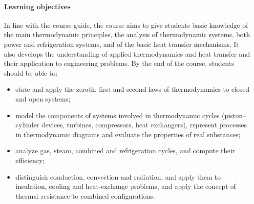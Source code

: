\documentclass[11pt]{article}
\begin{document}
\paragraph{Learning objectives}

In line with the course guide, the course aims to give students basic knowledge of the main thermodynamic principles, the analysis of thermodynamic systems, both power and refrigeration systems, and of the basic heat transfer mechanisms. 
It also develops the understanding of applied thermodynamics and heat transfer and their application to engineering problems.
By the end of the course, students should be able to:
\begin{itemize}
  \item state and apply the zeroth, first and second laws of thermodynamics to closed and   open systems;
  \item model the components of systems involved in thermodynamic cycles (piston--cylinder devices, turbines, compressors, heat exchangers), represent processes in thermodynamic diagrams and evaluate the properties of real substances;
  \item analyze gas, steam, combined and refrigeration cycles, and compute their efficiency;
  \item distinguish conduction, convection and radiation, and apply them to insulation, cooling and heat-exchange problems, and apply the concept of thermal resistance to combined configurations.
\end{itemize}
\end{document}
